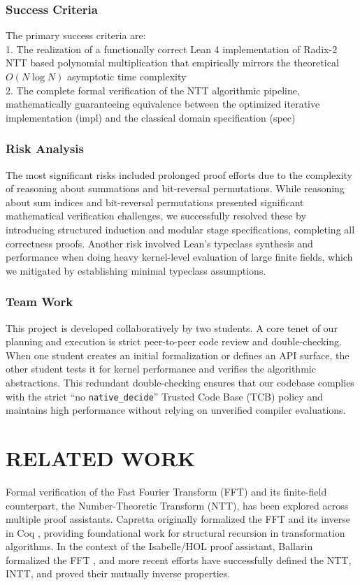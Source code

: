 \documentclass[a4paper,12pt]{report}
\begin{document}
\subsection{Success Criteria}
The primary success criteria are: \\
1. The realization of a functionally correct Lean 4 implementation of Radix-2 NTT based polynomial multiplication that empirically mirrors the theoretical $O(N \log N)$ asymptotic time complexity \\
2. The complete formal verification of the NTT algorithmic pipeline, mathematically guaranteeing equivalence between the optimized iterative implementation (impl) and the classical domain specification (spec)

\subsection{Risk Analysis}
The most significant risks included prolonged proof efforts due to the complexity of reasoning about summations and bit-reversal permutations. While reasoning about sum indices and bit-reversal permutations presented significant mathematical verification challenges, we successfully resolved these by introducing structured induction and modular stage specifications, completing all correctness proofs. Another risk involved Lean's typeclass synthesis and performance when doing heavy kernel-level evaluation of large finite fields, which we mitigated by establishing minimal typeclass assumptions.

\subsection{Team Work}
This project is developed collaboratively by two students. A core tenet of our planning and execution is strict peer-to-peer code review and double-checking. When one student creates an initial formalization or defines an API surface, the other student tests it for kernel performance and verifies the algorithmic abstractions. This redundant double-checking ensures that our codebase complies with the strict ``no \texttt{native\_decide}'' Trusted Code Base (TCB) policy and maintains high performance without relying on unverified compiler evaluations.

\chapter{RELATED WORK}
Formal verification of the Fast Fourier Transform (FFT) and its finite-field counterpart, the Number-Theoretic Transform (NTT), has been explored across multiple proof assistants. Capretta originally formalized the FFT and its inverse in Coq \cite{capretta_fft}, providing foundational work for structural recursion in transformation algorithms. In the context of the Isabelle/HOL proof assistant, Ballarin formalized the FFT \cite{ballarin_fft_2005}, and more recent efforts have successfully defined the NTT, INTT, and proved their mutually inverse properties.
\end{document}
